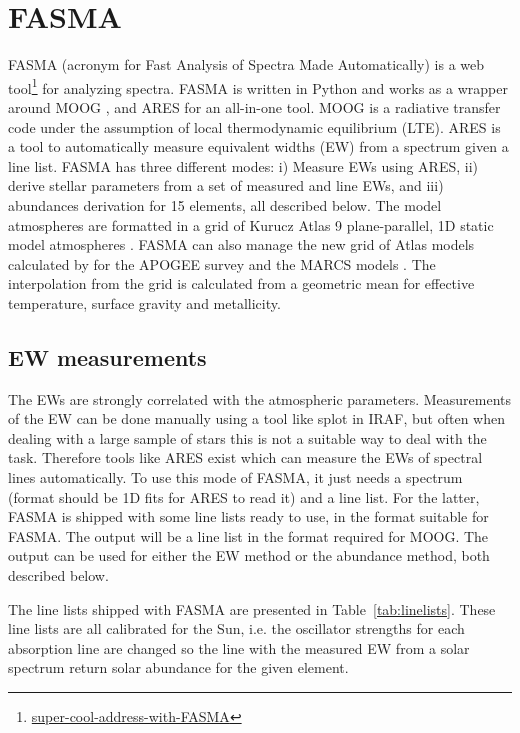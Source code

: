 \documentclass{aa}
\begin{document}
\section{FASMA}
\label{sec:FASMA}
FASMA (acronym for Fast Analysis of Spectra Made Automatically) is a web
tool\footnote{\url{super-cool-address-with-FASMA}} for analyzing spectra. FASMA
is written in Python and works as a wrapper around MOOG
\citep[][version 2014]{Sneden1973}, and ARES \citep{Sousa2015a} for an all-in-one
tool. MOOG is a radiative transfer code under the assumption of local
thermodynamic equilibrium (LTE). ARES is a tool to automatically measure
equivalent widths (EW) from a spectrum given a line list. FASMA has three
different modes: i) Measure EWs using ARES, ii) derive stellar parameters from a
set of measured  and  line EWs, and iii) abundances
derivation for 15 elements, all described below. The model atmospheres are
formatted in a grid of Kurucz Atlas 9 plane-parallel, 1D static model
atmospheres \citet{Kurucz1993}. FASMA can also manage the new grid of Atlas
models calculated by \citet{Meszaros2012} for the APOGEE survey and the MARCS
models \citep{Gustafson2008}. The interpolation from the grid is calculated from
a geometric mean for effective temperature, surface gravity and metallicity.



\subsection{EW measurements}
\label{sub:EW_measurements}
The EWs are strongly correlated with the atmospheric parameters. Measurements of
the EW can be done manually using a tool like splot in IRAF, but often when
dealing with a large sample of stars this is not a suitable way to deal with the
task. Therefore tools like ARES exist which can measure the EWs of spectral
lines automatically. To use this mode of FASMA, it just needs a spectrum (format
should be 1D fits for ARES to read it) and a line list. For the latter, FASMA is
shipped with some line lists ready to use, in the format suitable for FASMA. The
output will be a line list in the format required for MOOG. The output can be
used for either the EW method or the abundance method, both described below.

The line lists shipped with FASMA are presented in Table~\ref{tab:linelists}.
These line lists are all calibrated for the Sun, i.e. the oscillator strengths
for each absorption line are changed so the line with the measured EW from a
solar spectrum return solar abundance for the given element.
\end{document}
